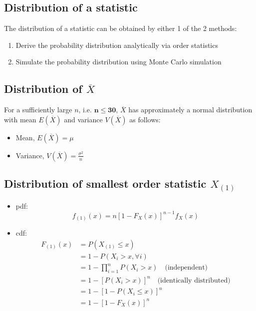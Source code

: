 \documentclass[a4paper]{article}
\begin{document}
\subsection{Distribution of a statistic}
The distribution of a statistic can be obtained by either 1 of the 2 methods:
\begin{enumerate}
    \item Derive the probability distribution analytically via order statistics
    \item Simulate the probability distribution using Monte Carlo simulation
\end{enumerate}
\subsection{Distribution of \texorpdfstring{$\overline{X}$}{Xbar}}
For a sufficiently large $n$, i.e. $\mathbf{n \leq 30}$, $\overline{X}$ has approximately a normal distribution with mean $E(\overline{X})$ and variance $V(\overline{X})$ as follows:
\begin{itemize}
    \item Mean, $E(\overline{X}) = \mu$
    \item Variance, $\displaystyle V(\overline{X}) = \frac{\sigma^2}{n}$
\end{itemize}
\subsection{Distribution of smallest order statistic \texorpdfstring{$X_{(1)}$}{X(1)}}
\begin{itemize}
    \item pdf:
    $$f_{(1)}(x) = n\left[1-F_{X}(x)\right]^{n-1}f_{X}(x)$$
    \item cdf: \begin{align*}
    F_{(1)}(x) &= P(X_{(1)}\leq x)\\
    &= 1 - P(X_{i}> x, \forall i)\\
    &= 1 - \prod_{i=1}^{n}P(X_{i}> x) \quad \text{(independent)}\\
    &= 1 - \left[P(X_{i}> x)\right]^{n} \quad \text{(identically distributed)}\\
    &= 1-\left[1-P(X_{i}\leq x)\right]^{n}\\
    &= 1-\left[1-F_{X}(x)\right]^{n}
\end{align*}
\end{itemize}
\end{document}
